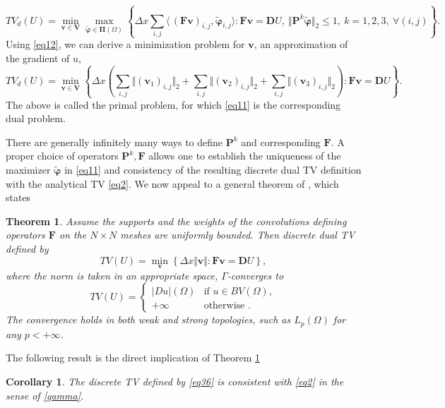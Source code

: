 \documentclass[reqno,a4paper,12pt]{amsart}
\newtheorem{theorem}{Theorem}[section]
\newtheorem{corollary}{Corollary}[theorem]
\begin{document}
\begin{equation}
    TV_d(U) = \min_{\bm{v} \in \bm{V}} \max_{\widetilde{\bm{\varphi}} \in \bm{\Pi}(\Omega)} \left\{ \Delta x \sum_{i,j} \langle\, (\bm F\bm{v})_{i,j}, \widetilde{\bm{\varphi}}_{i,j} \rangle : \bm F\bm{v} = \bm{D}U,  ~\Vert \bm P^k \widetilde{\bm{\varphi}} \Vert_2 \leq 1, ~k = 1,2,3,~ \forall (i,j) \right\}.
    \label{eq12}
\end{equation}
Using \eqref{eq12}, we can derive a minimization problem for $\bm{v}$, an approximation of the gradient of $u$,
\begin{equation}
    TV_d(U) = \min_{\bm{v} \in \bm{V}} \left\{ \Delta x \left(\sum_{i,j} \Vert (\bm{v}_1)_{i,j} \Vert_2 + \sum_{i,j} \Vert (\bm{v}_2)_{i,j} \Vert_2 + \sum_{i,j} \Vert (\bm{v}_3)_{i,j} \Vert_2 \right) : \bm{F} \bm{v} = \bm{D}U \right\}\label{eq37}.
\end{equation}
The above is called the primal problem, for which \eqref{eq11} is the corresponding dual problem. 

There are generally infinitely many ways to define $\bm P^k$ and corresponding $\bm{F}$. A proper choice of operators $\bm P^k, \bm{F}$ allows one to establish the uniqueness of the maximizer $\widetilde{\bm{\varphi}}$ in \eqref{eq11} and consistency of the resulting discrete dual TV definition with the analytical TV \eqref{eq2}. We now appeal to a general theorem of \cite{ChambollePock}, which states
\begin{theorem}
Assume the supports and the weights of the convolutions defining operators $\bm{F}$ on the $N \times N$ meshes are uniformly bounded. Then discrete dual TV defined by
\begin{equation}
    TV(U) = \min_{\bm{v}} \left\{ \Delta x  \Vert \bm{v} \Vert : \bm{F} \bm{v} = \bm{D}U \right\},
\end{equation}
where the norm is taken in an appropriate space, $\Gamma$-converges to
\begin{equation}
TV(U) = \left\{ 
\begin{array}{ll}
\vert Du \vert (\Omega)  & \mbox{if } u \in BV(\Omega), \\ 
+\infty & \mbox{otherwise }.
\end{array}%
\right. 
\label{gamma}
\end{equation}
The convergence holds in both weak and strong topologies, such as $L_p(\Omega)$ for any $p < +\infty$.
\label{theorem}
\end{theorem}
The following result is the direct implication of Theorem \ref{theorem}
\begin{corollary}
The discrete TV defined by \eqref{eq36} is consistent with \eqref{eq2} in the sense of \eqref{gamma}.
\end{corollary}
\end{document}
